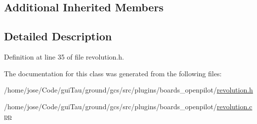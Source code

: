\subsection*{Additional Inherited Members}


\subsection{Detailed Description}


Definition at line 35 of file revolution.\-h.



The documentation for this class was generated from the following files\-:\begin{DoxyCompactItemize}
\item 
/home/jose/\-Code/gui\-Tau/ground/gcs/src/plugins/boards\-\_\-openpilot/\hyperlink{revolution_8h}{revolution.\-h}\item 
/home/jose/\-Code/gui\-Tau/ground/gcs/src/plugins/boards\-\_\-openpilot/\hyperlink{revolution_8cpp}{revolution.\-cpp}\end{DoxyCompactItemize}
